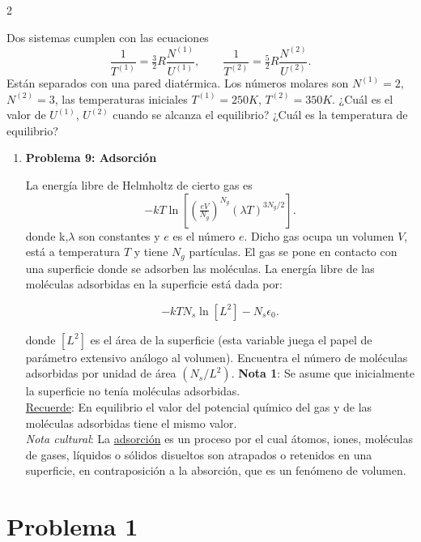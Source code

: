 \documentclass{article}
\begin{document}
\begin{multicols}{2}
\begin{enumerate}[label={{\textcolor{trueblue}{\textbf{Ej}. \arabic*.0}}}, start=8]
Dos sistemas cumplen con las ecuaciones
\[
\frac{1}{T^{(1)}} = \tfrac{3}{2}R\frac{N^{(1)}}{U^{(1)}}, \qquad \frac{1}{T^{(2)}} = \tfrac{5}{2}R\frac{N^{(2)}}{U^{(2)}}.
\]
Están separados con una pared diatérmica. Los números molares son  $N^{(1)}=2$, $N^{(2)}=3$, las temperaturas iniciales $T^{(1)}=250K$, $T^{(2)}=350K$. ¿Cuál es el valor de $U^{(1)}$, $U^{(2)}$ cuando se alcanza el equilibrio? ¿Cuál es la temperatura de equilibrio?
\end{enumerate}


\begin{enumerate}[label={{\textcolor{trueblue}{\textbf{Ej}. \arabic*.0}}}, start=9]
\item \textbf{Problema 9: Adsorción}


La energía libre de Helmholtz de cierto gas es
\[
-kT \ln \left[ \left( \tfrac{eV}{N_g} \right)^{N_g} (\lambda T)^{3N_g/2} \right].
\]
donde k,$\lambda$ son constantes y $e$ es el número $e$. Dicho gas ocupa un volumen $V$, está a temperatura $T$ y tiene $N_{g}$ partículas.  El gas se pone en contacto con una superficie donde se adsorben las moléculas. La energía libre de las moléculas adsorbidas en la superficie está dada por:

\[
-kTN_s \ln[L^2] - N_s \epsilon_0.
\]

donde $[L^{2}]$ es el área de la superficie (esta variable juega el papel de parámetro extensivo análogo al volumen). Encuentra el número de moléculas adsorbidas por unidad de área $(N_{s}/L^{2})$.
\textbf{Nota 1}: Se asume que inicialmente la superficie no tenía moléculas adsorbidas. \\

\underline{Recuerde}: En equilibrio el valor del potencial químico del gas y de las moléculas adsorbidas tiene el mismo valor.\\

 \textit{Nota cultural}: La \underline{adsorción} es un proceso por el cual átomos, iones, moléculas de gases, líquidos o sólidos disueltos son atrapados o retenidos en una superficie, en contraposición a la absorción, que es un fenómeno de volumen. 
\end{enumerate}


\end{multicols}


\tableofcontents \newpage

\section*{Problema 1}
\end{document}
